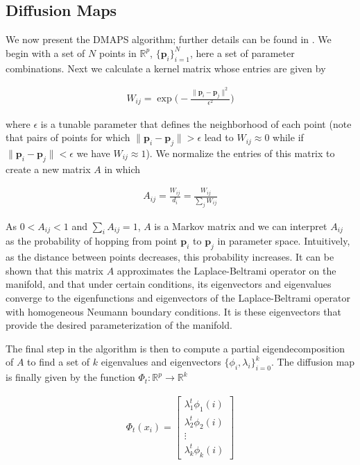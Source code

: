 \subsection{Diffusion Maps}

We now present the DMAPS algorithm; further details can be found in
\cite{}. We begin with a set of $N$ points in $\mathbb{R}^p$,
$\{\mathbf{p}_i\}_{i=1}^N$, here a set of parameter combinations. Next
we calculate a kernel matrix whose entries are given by

\begin{align}
  W_{ij} = \exp\bigg(-\frac{\| \mathbf{p}_i - \mathbf{p}_j \|^2}{\epsilon^2}\bigg)
  \label{eq:dmaps-w}
\end{align}

where $\epsilon$ is a tunable parameter that defines the neighborhood
of each point (note that pairs of points for which
$\|\mathbf{p}_i - \mathbf{p}_j\| > \epsilon$ lead to
$W_{ij} \approx 0$ while if
$\|\mathbf{p}_i - \mathbf{p}_j\| < \epsilon$ we have
$W_{ij} \approx 1$). We normalize the entries of this matrix to create
a new matrix $A$ in which

\begin{align}
  A_{ij} = \frac{W_{ij}}{d_i} = \frac{W_{ij}}{\sum_j W_{ij}}
  \label{eq:dmaps-a}
\end{align}

As $0 < A_{ij} < 1$ and $\sum_i A_{ij} = 1$, $A$ is a Markov matrix
and we can interpret $A_{ij}$ as the probability of hopping from point
$\mathbf{p}_i$ to $\mathbf{p}_j$ in parameter space. Intuitively, as
the distance between points decreases, this probability increases. It
can be shown that this matrix $A$ approximates the Laplace-Beltrami
operator on the manifold, and that under certain conditions, its
eigenvectors and eigenvalues converge to the eigenfunctions and
eigenvectors of the Laplace-Beltrami operator with homogeneous Neumann
boundary conditions. It is these eigenvectors that provide the desired
parameterization of the manifold.

The final step in the algorithm is then to compute a partial
eigendecomposition of $A$ to find a set of $k$ eigenvalues and
eigenvectors $\{\phi_i, \lambda_i\}_{i=0}^k$. The diffusion map is
finally given by the function
$\Phi_t : \mathbb{R}^p \rightarrow \mathbb{R}^k$

\begin{align}
  \Phi_t(x_i) = \begin{bmatrix} \lambda_1^t \phi_1(i) \\ \lambda_2^t
    \phi_2(i) \\ \vdots \\ \lambda_k^t \phi_k(i) \end{bmatrix}
\end{align}

